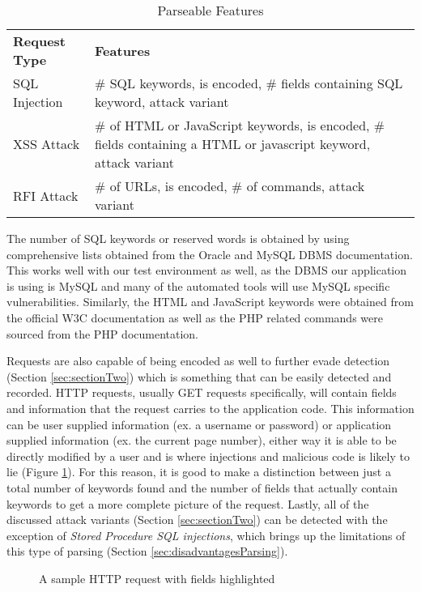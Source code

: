 \begin{table}
	\centering
	\begin{tabular}{|p{1.5in}|p{4.5in}|}
	\hline
		\textbf{Request Type} & \textbf{Features}\\
	\hhline{|=|=|}
		SQL Injection & \# SQL keywords, is encoded, \# fields containing SQL keyword, attack variant\\
	\hline
		XSS Attack & \# of HTML or JavaScript keywords, is encoded, \# fields containing a HTML or javascript keyword, attack variant\\
	\hline
		RFI Attack & \# of URLs, is encoded, \# of commands, attack variant\\
	\hline
	\end{tabular}
	\caption{Parseable Features}
	\label{tab:features}
\end{table}

The number of SQL keywords or reserved words is obtained by using comprehensive lists obtained from the Oracle and MySQL DBMS documentation.\cite{oracle}\cite{mysql}  This works well with our test environment as well, as the DBMS our application is using is MySQL and many of the automated tools will use MySQL specific vulnerabilities.  Similarly, the HTML and JavaScript keywords were obtained from the official W3C documentation\cite{w3c1}\cite{w3c2}\cite{w3c3} as well as the PHP related commands were sourced from the PHP documentation.\cite{php}

Requests are also capable of being encoded as well to further evade detection (Section \ref{sec:sectionTwo}) which is something that can be easily detected and recorded.  HTTP requests, usually GET requests specifically, will contain fields and information that the request carries to the application code.  This information can be user supplied information (ex. a username or password) or application supplied information (ex. the current page number), either way it is able to be directly modified by a user and is where injections and malicious code is likely to lie (Figure \ref{fig:sampleRequest}).  For this reason, it is good to make a distinction between just a total number of keywords found and the number of fields that actually contain keywords to get a more complete picture of the request.  Lastly, all of the discussed attack variants (Section \ref{sec:sectionTwo}) can be detected with the exception of \emph{Stored Procedure SQL injections}, which brings up the limitations of this type of parsing (Section \ref{sec:disadvantagesParsing}).

\begin{figure}
	\centering
	\caption{A sample HTTP request with fields highlighted}
	\label{fig:sampleRequest}
\end{figure}

